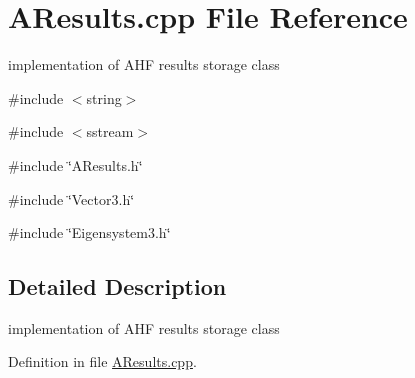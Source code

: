 \section{AResults.cpp File Reference}
\label{AResults_8cpp}


implementation of AHF results storage class  


{\ttfamily \#include $<$string$>$}\par
{\ttfamily \#include $<$sstream$>$}\par
{\ttfamily \#include \char`\"{}AResults.h\char`\"{}}\par
{\ttfamily \#include \char`\"{}Vector3.h\char`\"{}}\par
{\ttfamily \#include \char`\"{}Eigensystem3.h\char`\"{}}\par


\subsection{Detailed Description}
implementation of AHF results storage class 

Definition in file \hyperlink{AResults_8cpp_source}{AResults.cpp}.

